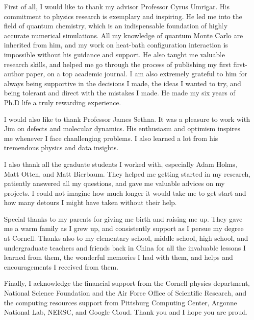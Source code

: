 \documentclass[phd,tocprelim]{cornell}
\begin{document}
\begin{acknowledgements}
First of all, I would like to thank my advisor Professor Cyrus Umrigar.
His commitment to physics research is exemplary and inspiring.
He led me into the field of quantum chemistry, which is an indispensable foundation of highly accurate numerical simulations.
All my knowledge of quantum Monte Carlo are inherited from him, and my work on heat-bath configuration interaction is impossible without his guidance and support.
He also taught me valuable research skills, and helped me go through the process of publishing my first first-author paper, on a top academic journal.
I am also extremely grateful to him for always being supportive in the decisions I made, the ideas I wanted to try, and being tolerant and direct with the mistakes I made.
He made my six years of Ph.D life a truly rewarding experience.

I would also like to thank Professor James Sethna.
It was a pleasure to work with Jim on defects and molecular dynamics.
His enthusiasm and optimism inspires me whenever I face chanllenging problems.
I also learned a lot from his tremendous physics and data insights.

I also thank all the graduate students I worked with, especially Adam Holms, Matt Otten, and Matt Bierbaum.
They helped me getting started in my research, patiently answered all my questions, and gave me valuable advices on my projects.
I could not imagine how much longer it would take me to get start and how many detours I might have taken without their help.

Special thanks to my parents for giving me birth and raising me up.
They gave me a warm family as I grew up, and consistently support as I persue my degree at Cornell.
Thanks also to my elementary school, middle school, high school, and undergraduate teachers and friends back in China for all the invaluable lessons I learned from them, the wonderful memories I had with them, and helps and encouragements I received from them.

Finally, I acknowledge the financial support from the Cornell physics department, National Science Foundation and the Air Force Office of Scientific Research, and the computing resources support from Pittsburg Computing Center, Argonne National Lab, NERSC, and Google Cloud.
Thank you and I hope you are proud.




\end{acknowledgements}
\end{document}
